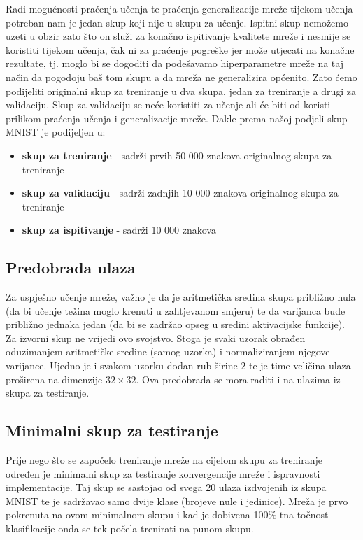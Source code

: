 \documentclass[times, utf8, zavrsni, numeric]{fer}
\begin{document}
Radi mogućnosti praćenja učenja te praćenja generalizacije mreže tijekom učenja potreban nam je jedan skup koji nije u skupu za učenje. Ispitni skup nemožemo uzeti u obzir zato što on služi za konačno ispitivanje kvalitete mreže i nesmije se koristiti tijekom učenja, čak ni za praćenje pogreške jer može utjecati na konačne rezultate, tj. moglo bi se dogoditi da podešavamo hiperparametre mreže na taj način da pogodoju baš tom skupu a da mreža ne generalizira općenito. Zato ćemo podijeliti originalni skup za treniranje u dva skupa, jedan za treniranje a drugi za validaciju. Skup za validaciju se neće koristiti za učenje ali će biti od koristi prilikom praćenja učenja i generalizacije mreže. Dakle prema našoj podjeli skup MNIST je podijeljen u:
\begin{itemize}
\item \textbf{skup za treniranje} - sadrži prvih 50 000 znakova originalnog skupa za treniranje
\item \textbf{skup za validaciju} - sadrži zadnjih 10 000 znakova originalnog skupa za treniranje
\item \textbf{skup za ispitivanje} - sadrži 10 000 znakova
\end{itemize}

\subsection{Predobrada ulaza}
Za uspješno učenje mreže, važno je da je aritmetička sredina skupa približno nula (da
bi učenje težina moglo krenuti u zahtjevanom smjeru) te da varijanca bude
približno jednaka jedan (da bi se zadržao opseg u sredini aktivacijske funkcije).
Za izvorni skup ne vrijedi ovo svojstvo. Stoga je svaki uzorak obrađen oduzimanjem 
aritmetičke sredine (samog uzorka) i normaliziranjem njegove varijance. Ujedno je i svakom uzorku dodan rub širine 2 te je time veličina ulaza proširena na dimenzije $32 \times 32$. Ova predobrada se mora raditi i na ulazima iz skupa za testiranje.

\subsection{Minimalni skup za testiranje}
Prije nego što se započelo treniranje mreže na cijelom skupu za treniranje određen je minimalni skup za testiranje konvergencije mreže i ispravnosti implementacije. Taj skup se sastojao od svega 20 ulaza izdvojenih iz skupa MNIST te je sadržavao samo dvije klase (brojeve nule i jedinice). Mreža je prvo pokrenuta na ovom minimalnom skupu i kad je dobivena 100\%-tna točnost klasifikacije onda se tek počela trenirati na punom skupu.
\end{document}
